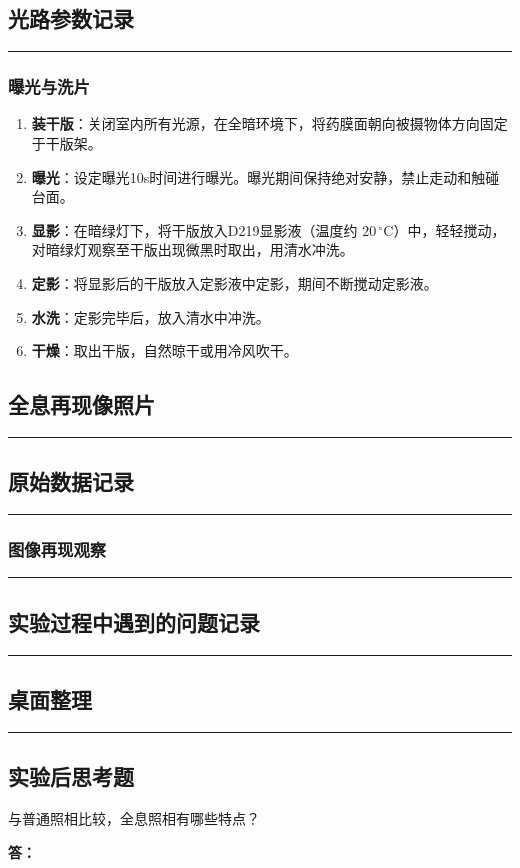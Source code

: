 \documentclass[dvipsnames, svgnames,a4paper,11pt]{article}
\newcommand{\answerblank}[1][3.8cm]{%
  \par\nopagebreak[4]\noindent\textbf{答：}\par\nopagebreak[4]\vspace*{#1}}
\newcommand{\recordblank}[1]{%
  \par\noindent\rule{0.95\linewidth}{0pt}\rule{0pt}{#1}\par}
\begin{document}
\subsection{光路参数记录}
\recordblank{5.5cm}
\subsubsection{曝光与洗片}

\begin{enumerate}
	\item \textbf{装干版}：关闭室内所有光源，在全暗环境下，将药膜面朝向被摄物体方向固定于干版架。
	\item \textbf{曝光}：设定曝光10s时间进行曝光。曝光期间保持绝对安静，禁止走动和触碰台面。
	\item \textbf{显影}：在暗绿灯下，将干版放入D219显影液（温度约 $20\,^\circ$C）中，轻轻搅动，对暗绿灯观察至干版出现微黑时取出，用清水冲洗。
	\item \textbf{定影}：将显影后的干版放入定影液中定影，期间不断搅动定影液。
	\item \textbf{水洗}：定影完毕后，放入清水中冲洗。
	\item \textbf{干燥}：取出干版，自然晾干或用冷风吹干。
\end{enumerate}

\subsection{全息再现像照片}
\recordblank{6cm}
\subsection{原始数据记录}
\recordblank{5.5cm}
\subsubsection{图像再现观察}
\recordblank{5.5cm}
\subsection{实验过程中遇到的问题记录}
\recordblank{5cm}
\subsection{桌面整理}
\recordblank{5.5cm}
\clearpage
\subsection{实验后思考题}
\begin{question}
	与普通照相比较，全息照相有哪些特点？
\end{question}
\answerblank[3.8cm]
\end{document}
